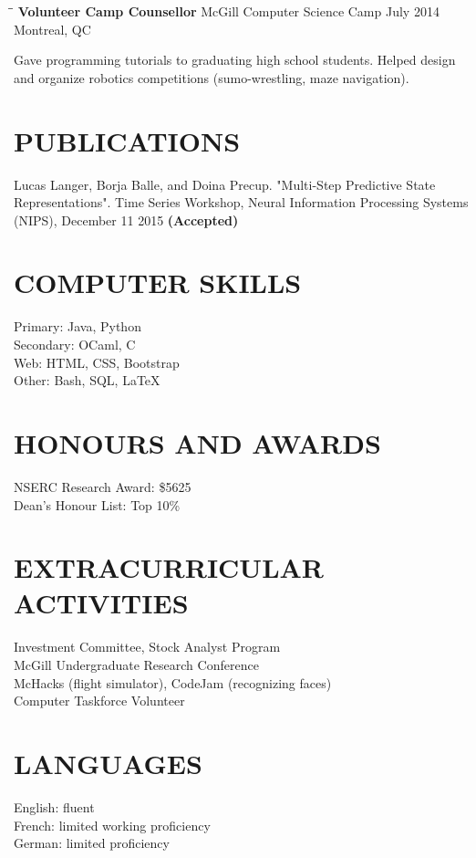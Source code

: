 \documentclass{res}
\begin{document}
\begin{resume}
   \begin{tabbing}
   \hspace{2.3in}\= \hspace{2.6in}\= \kill %
    {\bf Volunteer Camp Counsellor} \> McGill Computer Science Camp \> July 2014\\
                          \>Montreal, QC
   \end{tabbing}\vspace{-20pt}
    Gave programming tutorials to graduating high school students. Helped design and organize robotics competitions (sumo-wrestling, maze navigation). 

\section{PUBLICATIONS}
	Lucas Langer, Borja Balle, and Doina Precup. "Multi-Step Predictive State Representations". Time Series Workshop, Neural Information Processing Systems (NIPS), December 11 2015 {\bf (Accepted)} 

\section{COMPUTER SKILLS}          
	Primary: Java, Python  \\
	Secondary: OCaml, C \\
	Web: HTML, CSS, Bootstrap \\
	Other: Bash, SQL, LaTeX        
 
\section{HONOURS AND AWARDS}          
    NSERC Research Award: \$5625   \\      
    Dean's Honour List: Top 10\%       
 
\section{EXTRACURRICULAR ACTIVITIES}
	Investment Committee, Stock Analyst Program  \\ 
	McGill Undergraduate Research Conference \\
	McHacks (flight simulator), CodeJam (recognizing faces)\\   
    Computer Taskforce Volunteer
    
\section{LANGUAGES}
	English: fluent  \\
	French: limited working proficiency \\
	German: limited proficiency

\end{resume}
\end{document}
